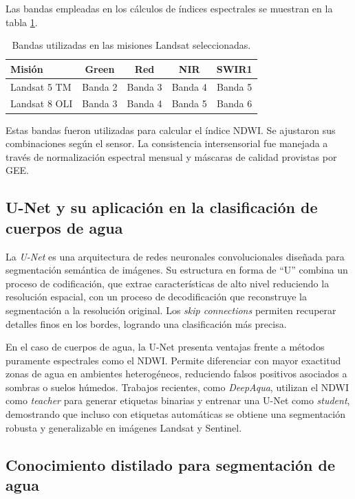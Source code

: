 Las bandas empleadas en los cálculos de índices espectrales se muestran en la tabla \ref{tab:landsat_bandas}.

\begin{table}[H]
\centering
\caption{Bandas utilizadas en las misiones Landsat seleccionadas.}
\label{tab:landsat_bandas}
\begin{tabular}{lcccc}
\toprule
Misión & Green & Red & NIR & SWIR1 \\
\midrule
Landsat 5 TM  & Banda 2 & Banda 3 & Banda 4 & Banda 5 \\
Landsat 8 OLI & Banda 3 & Banda 4 & Banda 5 & Banda 6 \\
\bottomrule
\end{tabular}
\end{table}



Estas bandas fueron utilizadas para calcular el índice NDWI. Se ajustaron sus combinaciones según el sensor. La consistencia intersensorial fue manejada a través de normalización espectral mensual y máscaras de calidad provistas por GEE.


\subsection{U-Net y su aplicación en la clasificación de cuerpos de agua}

La \textit{U-Net} es una arquitectura de redes neuronales convolucionales diseñada para
segmentación semántica de imágenes. Su estructura en forma de ``U'' combina un
proceso de codificación, que extrae características de alto nivel reduciendo la
resolución espacial, con un proceso de decodificación que reconstruye la
segmentación a la resolución original. Los \textit{skip connections} permiten
recuperar detalles finos en los bordes, logrando una clasificación más precisa.

En el caso de cuerpos de agua, la U-Net presenta ventajas frente a métodos
puramente espectrales como el NDWI. Permite diferenciar con mayor exactitud
zonas de agua en ambientes heterogéneos, reduciendo falsos positivos asociados
a sombras o suelos húmedos. Trabajos recientes, como \textit{DeepAqua}\cite{DeepAqua2023},
utilizan el NDWI como \textit{teacher} para generar etiquetas binarias y entrenar
una U-Net como \textit{student}, demostrando que incluso con etiquetas automáticas
se obtiene una segmentación robusta y generalizable en imágenes Landsat y Sentinel.


\subsection{Conocimiento distilado para segmentación de agua}


